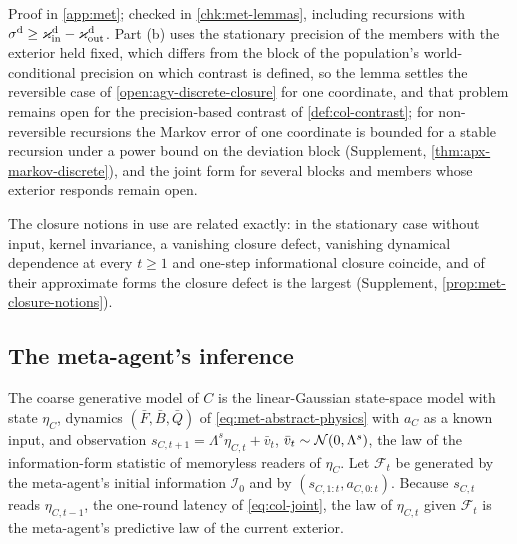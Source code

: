 Proof in \cref{app:met}; checked in \cref{chk:met-lemmas}, including recursions with $\sigma^{\mathrm d}\ge\varkappa_{\mathrm{in}}^{\mathrm d}-\varkappa_{\mathrm{out}}^{\mathrm d}$. Part (b) uses the stationary precision of the members with the exterior held fixed, which differs from the block of the population's world-conditional precision on which contrast is defined, so the lemma settles the reversible case of \cref{open:agy-discrete-closure} for one coordinate, and that problem remains open for the precision-based contrast of \cref{def:col-contrast}; for non-reversible recursions the Markov error of one coordinate is bounded for a stable recursion under a power bound on the deviation block (Supplement, \cref{thm:apx-markov-discrete}), and the joint form for several blocks and members whose exterior responds remain open.

The closure notions in use are related exactly: in the stationary case without input, kernel invariance, a vanishing closure defect, vanishing dynamical dependence at every $t\ge1$ and one-step informational closure coincide, and of their approximate forms the closure defect is the largest (Supplement, \cref{prop:met-closure-notions}).

\subsection{The meta-agent's inference}\label{sec:met-inference}

The coarse generative model of $C$ is the linear-Gaussian state-space model with state $\eta_C$, dynamics $(\bar F,\bar B,\bar Q)$ of \eqref{eq:met-abstract-physics} with $a_C$ as a known input, and observation $s_{C,t+1}=\Lambda^s\eta_{C,t}+\bar v_t$, $\bar v_t\sim\mathcal{N}(0,\Lambda^s)$, the law of the information-form statistic of memoryless readers of $\eta_C$. Let $\mathcal F_t$ be generated by the meta-agent's initial information $\mathcal I_0$ and by $(s_{C,1:t},a_{C,0:t})$. Because $s_{C,t}$ reads $\eta_{C,t-1}$, the one-round latency of \eqref{eq:col-joint}, the law of $\eta_{C,t}$ given $\mathcal F_t$ is the meta-agent's predictive law of the current exterior.

